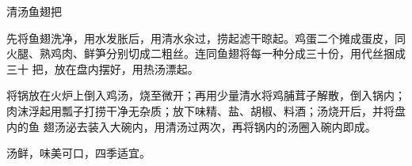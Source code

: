 \begin{recipe}{清汤鱼翅把}

\ingredients


\preparation

\step 先将鱼翅洗净，用水发胀后，用清水汆过，捞起滤干晾起。鸡蛋二个摊成蛋皮，同
火腿、熟鸡肉、鲜笋分别切成二粗丝。连同鱼翅将每一种分成三十份，用代丝捆成三十
把，放在盘内摆好，用热汤漂起。

\step 将锅放在火炉上倒入鸡汤，烧至微开；再用少量清水将鸡脯茸子解散，倒入锅内；
肉沫浮起用瓢子打捞干净无杂质；放下味精、盐、胡椒、料酒；汤烧开后，并将盘内的鱼
翅汤泌去装入大碗内，用清汤过两次，再将锅内的汤圈入碗内即成。

\features

汤鲜，味美可口，四季适宜。

\end{recipe}

